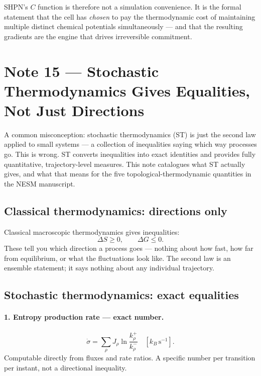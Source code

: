 \documentclass[11pt,a4paper]{article}
\begin{document}
SHPN's $C$ function is therefore not a simulation convenience.  It is the
formal statement that the cell has \emph{chosen} to pay the thermodynamic
cost of maintaining multiple distinct chemical potentials simultaneously ---
and that the resulting gradients are the engine that drives irreversible
commitment.

\section*{Note 15 — Stochastic Thermodynamics Gives Equalities, Not Just Directions}
\label{note:equalities}

A common misconception: stochastic thermodynamics (ST) is just the second law
applied to small systems --- a collection of inequalities saying which way
processes go.  This is wrong.  ST converts inequalities into exact identities
and provides fully quantitative, trajectory-level measures.  This note
catalogues what ST actually gives, and what that means for the five
topological-thermodynamic quantities in the NESM manuscript.

\subsection*{Classical thermodynamics: directions only}

Classical macroscopic thermodynamics gives inequalities:
\[
  \Delta S \geq 0, \qquad \Delta G \leq 0.
\]
These tell you which direction a process goes --- nothing about how fast, how
far from equilibrium, or what the fluctuations look like.  The second law is
an ensemble statement; it says nothing about any individual trajectory.

\subsection*{Stochastic thermodynamics: exact equalities}

\paragraph{1. Entropy production rate --- exact number.}
\[
  \dot\sigma = \sum_\rho J_\rho \ln\frac{k_\rho^+}{k_\rho^-}
  \quad [k_B\,\mathrm{s}^{-1}].
\]
Computable directly from fluxes and rate ratios.  A specific number per
transition per instant, not a directional inequality.
\end{document}
